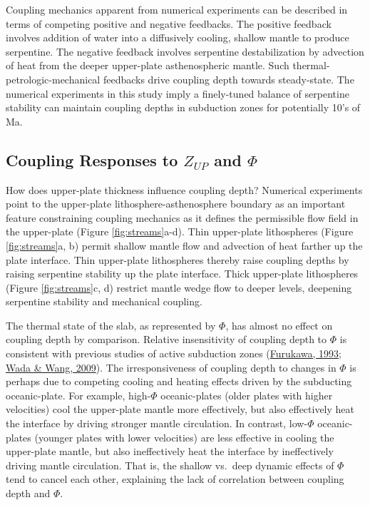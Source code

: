 Coupling mechanics apparent from numerical experiments can be described in terms of competing positive and negative feedbacks. The positive feedback involves addition of water into a diffusively cooling, shallow mantle to produce serpentine. The negative feedback involves serpentine destabilization by advection of heat from the deeper upper-plate asthenospheric mantle. Such thermal-petrologic-mechanical feedbacks drive coupling depth towards steady-state. The numerical experiments in this study imply a finely-tuned balance of serpentine stability can maintain coupling depths in subduction zones for potentially 10's of Ma.

\hypertarget{cplResponses}{%
\subsection{\texorpdfstring{Coupling Responses to \(Z_{UP}\) and \(\Phi\)}{Coupling Responses to Z\_\{UP\} and \textbackslash Phi}}\label{cplResponses}}

How does upper-plate thickness influence coupling depth? Numerical experiments point to the upper-plate lithosphere-asthenosphere boundary as an important feature constraining coupling mechanics as it defines the permissible flow field in the upper-plate (Figure \ref{fig:streams}a-d). Thin upper-plate lithospheres (Figure \ref{fig:streams}a, b) permit shallow mantle flow and advection of heat farther up the plate interface. Thin upper-plate lithospheres thereby raise coupling depths by raising serpentine stability up the plate interface. Thick upper-plate lithospheres (Figure \ref{fig:streams}c, d) restrict mantle wedge flow to deeper levels, deepening serpentine stability and mechanical coupling.

The thermal state of the slab, as represented by \(\Phi\), has almost no effect on coupling depth by comparison. Relative insensitivity of coupling depth to \(\Phi\) is consistent with previous studies of active subduction zones (\protect\hyperlink{ref-furukawa1993}{Furukawa, 1993}; \protect\hyperlink{ref-wada2009}{Wada \& Wang, 2009}). The irresponsiveness of coupling depth to changes in \(\Phi\) is perhaps due to competing cooling and heating effects driven by the subducting oceanic-plate. For example, high-\(\Phi\) oceanic-plates (older plates with higher velocities) cool the upper-plate mantle more effectively, but also effectively heat the interface by driving stronger mantle circulation. In contrast, low-\(\Phi\) oceanic-plates (younger plates with lower velocities) are less effective in cooling the upper-plate mantle, but also ineffectively heat the interface by ineffectively driving mantle circulation. That is, the shallow vs.~deep dynamic effects of \(\Phi\) tend to cancel each other, explaining the lack of correlation between coupling depth and \(\Phi\).

